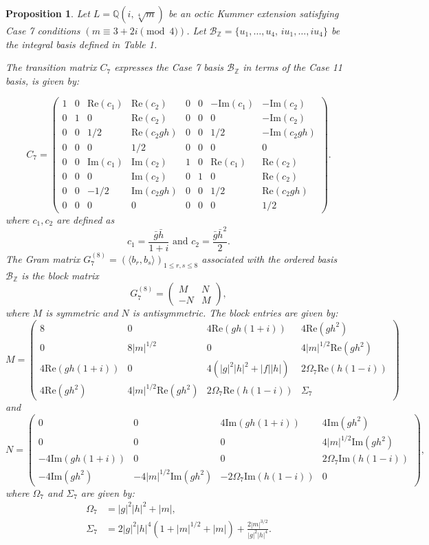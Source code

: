 \documentclass{amsart}
\theoremstyle{plain}
\newtheorem{proposition}[theorem]{Proposition}
\theoremstyle{definition}
\theoremstyle{remark}
\numberwithin{equation}{section}
\begin{document}
\begin{proposition}
Let $L = \mathbb{Q}(i, \sqrt[4]{m})$ be an octic Kummer extension satisfying Case 7 conditions  $(m \equiv 3+2i \pmod 4)$. Let $\mathcal{B}_{\mathbb{Z}} = \{u_1, \dots, u_4, \, i u_1, \dots, i u_4\}$ be the integral basis defined in Table 1.

The transition matrix $C_{7}$ expresses the Case 7 basis $\mathcal{B}_{\mathbb{Z}}$ in terms of the Case 11 basis, is given by:

\[
C_{7} = \begin{pmatrix}
1 & 0 & \text{Re}(c_1) & \text{Re}(c_2) & 0 & 0 & -\text{Im}(c_1) & -\text{Im}(c_2) \\ 
0 & 1 & 0 & \text{Re}(c_2) & 0 & 0 & 0 & -\text{Im}(c_2) \\ 
0 & 0 & 1/2 & \text{Re}(c_2 gh) & 0 & 0 & 1/2 & -\text{Im}(c_2 gh) \\ 
0 & 0 & 0 & 1/2 & 0 & 0 & 0 & 0 \\ 
0 & 0 & \text{Im}(c_1) & \text{Im}(c_2) & 1 & 0 & \text{Re}(c_1) & \text{Re}(c_2) \\ 
0 & 0 & 0 & \text{Im}(c_2) & 0 & 1 & 0 & \text{Re}(c_2) \\ 
0 & 0 & -1/2 & \text{Im}(c_2 gh) & 0 & 0 & 1/2 & \text{Re}(c_2 gh) \\ 
0 & 0 & 0 & 0 & 0 & 0 & 0 & 1/2 
\end{pmatrix}.
\]
where $c_1, c_2$ are defined as 
$$c_1 = \frac{\bar{g}\bar{h}}{1+i} \mbox{ and } c_2 = \frac{\bar{g}\bar{h}^2}{2}.$$
The Gram matrix $G_{7}^{(8)} = (\langle b_r, b_s \rangle)_{1\le r,s \le 8}$ associated with the ordered basis $\mathcal{B}_{\mathbb{Z}}$ is the block matrix
\[
G_{7}^{(8)} = \begin{pmatrix} M & N \\ -N & M \end{pmatrix},
\]
where $M$ is symmetric and $N$ is antisymmetric. The block entries are given by:
\[
M = \begin{pmatrix}
8 & 0 & 4\text{Re}(gh(1+i)) & 4\text{Re}(gh^2) \\
0 & 8|m|^{1/2} & 0 & 4|m|^{1/2}\text{Re}(gh^2) \\
4\text{Re}(gh(1+i)) & 0 & 4(|g|^2|h|^2 + |f||h|) & 2\Omega_7\text{Re}(h(1-i)) \\
4\text{Re}(gh^2) & 4|m|^{1/2}\text{Re}(gh^2) & 2\Omega_7\text{Re}(h(1-i)) & \Sigma_7
\end{pmatrix}
\]
and
\[
N = \begin{pmatrix}
0 & 0 & 4\text{Im}(gh(1+i)) & 4\text{Im}(gh^2) \\
0 & 0 & 0 & 4|m|^{1/2}\text{Im}(gh^2) \\
-4\text{Im}(gh(1+i)) & 0 & 0 & 2\Omega_7\text{Im}(h(1-i)) \\
-4\text{Im}(gh^2) & -4|m|^{1/2}\text{Im}(gh^2) & -2\Omega_7\text{Im}(h(1-i)) & 0
\end{pmatrix},
\]
where $\Omega_7$ and $\Sigma_7$ are given by:
\begin{align*}
\Omega_7 &= |g|^2|h|^2 + |m|, \\
\Sigma_7 &= 2|g|^2|h|^4 (1 + |m|^{1/2} + |m|) + \frac{2|m|^{3/2}}{|g|^2|h|^4}.
\end{align*}
\end{proposition}
\end{document}
